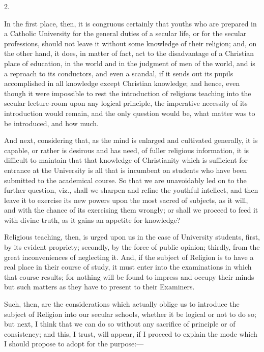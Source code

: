 2.

In the first place, then, it is congruous certainly that youths who
are prepared in a Catholic University for the general duties of a
secular life, or for the secular professions, should not leave it
without some knowledge of their religion; and, on the other hand, it
does, in matter of fact, act to the disadvantage of a Christian place
of education, in the world and in the judgment of men of the world,
and is a reproach to its conductors, and even a scandal, if it sends
out its pupils accomplished in all knowledge except Christian
knowledge; and hence, even though it were impossible to rest the
introduction of religious teaching into the secular lecture-room upon
any logical principle, the imperative necessity of its introduction
would remain, and the only question would be, what matter was to be
introduced, and how much.

And next, considering that, as the mind is enlarged and cultivated
generally, it is capable, or rather is desirous and has need, of
fuller religious information, it is difficult to maintain that that
knowledge of Christianity which is sufficient for entrance at the
University is all that is incumbent on students who have been
submitted to the academical course. So that we are unavoidably led on
to the further question, viz., shall we sharpen and refine the
youthful intellect, and then leave it to exercise its new powers upon
the most sacred of subjects, as it will, and with the chance of its
exercising them wrongly; or shall we proceed to feed it with divine
truth, as it gains an appetite for knowledge?

Religious teaching, then, is urged upon us in the case of
University students, first, by its evident propriety; secondly, by the
force of public opinion; thirdly, from the great inconveniences of
neglecting it. And, if the subject of Religion is to have a real place
in their course of study, it must enter into the examinations in which
that course results; for nothing will be found to impress and occupy
their minds but such matters as they have to present to their
Examiners.

Such, then, are the considerations which actually oblige us to
introduce the subject of Religion into our secular schools, whether it
be logical or not to do so; but next, I think that we can do so
without any sacrifice of principle or of consistency; and this, I
trust, will appear, if I proceed to explain the mode which I should
propose to adopt for the purpose:—

